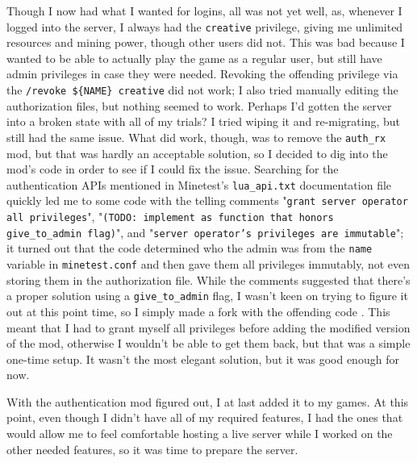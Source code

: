 \documentclass{article}
\begin{document}
Though I now had what I wanted for logins, all was not yet well, as, whenever I logged into the server, I always had the \texttt{creative} privilege, giving me unlimited resources and mining power, though other users did not.  This was bad because I wanted to be able to actually play the game as a regular user, but still have admin privileges in case they were needed.  Revoking the offending privilege via the \verb|/revoke ${NAME} creative| did not work; I also tried manually editing the authorization files, but nothing seemed to work.  Perhaps I'd gotten the server into a broken state with all of my trials?  I tried wiping it and re-migrating, but still had the same issue.  What did work, though, was to remove the \texttt{auth_rx} mod, but that was hardly an acceptable solution, so I decided to dig into the mod's code in order to see if I could fix the issue.  Searching for the authentication APIs mentioned in Minetest's \texttt{lua_api.txt} documentation file quickly led me to some code with the telling comments "\texttt{grant server operator all privileges}", "\texttt{(TODO: implement as function that honors give_to_admin flag)}", and "\texttt{server operator's privileges are immutable}"; it turned out that the code determined who the admin was from the \texttt{name} variable in \texttt{minetest.conf} and then gave them all privileges immutably, not even storing them in the authorization file.  While the comments suggested that there's a proper solution using a \texttt{give_to_admin} flag, I wasn't keen on trying to figure it out at this point time, so I simply made a fork with the offending code .  This meant that I had to grant myself all privileges before adding the modified version of the mod, otherwise I wouldn't be able to get them back, but that was a simple one-time setup.  It wasn't the most elegant solution, but it was good enough for now.

With the authentication mod figured out, I at last added it to my games.  At this point, even though I didn't have all of my required features, I had the ones that would allow me to feel comfortable hosting a live server while I worked on the other needed features, so it was time to prepare the server.
\end{document}
